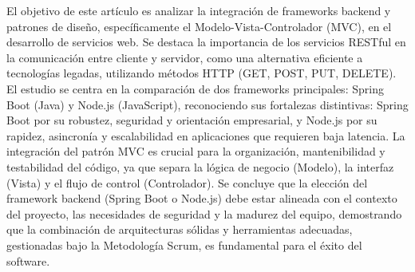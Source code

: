 El objetivo de este artículo es analizar la integración de frameworks backend y patrones de diseño, específicamente el Modelo-Vista-Controlador (MVC), en el desarrollo de servicios web. Se destaca la importancia de los servicios RESTful en la comunicación entre cliente y servidor, como una alternativa eficiente a tecnologías legadas, utilizando métodos HTTP (GET, POST, PUT, DELETE). El estudio se centra en la comparación de dos frameworks principales: Spring Boot (Java) y Node.js (JavaScript), reconociendo sus fortalezas distintivas: Spring Boot por su robustez, seguridad y orientación empresarial, y Node.js por su rapidez, asincronía y escalabilidad en aplicaciones que requieren baja latencia. La integración del patrón MVC es crucial para la organización, mantenibilidad y testabilidad del código, ya que separa la lógica de negocio (Modelo), la interfaz (Vista) y el flujo de control (Controlador). Se concluye que la elección del framework backend (Spring Boot o Node.js) debe estar alineada con el contexto del proyecto, las necesidades de seguridad y la madurez del equipo, demostrando que la combinación de arquitecturas sólidas y herramientas adecuadas, gestionadas bajo la Metodología Scrum, es fundamental para el éxito del software.
